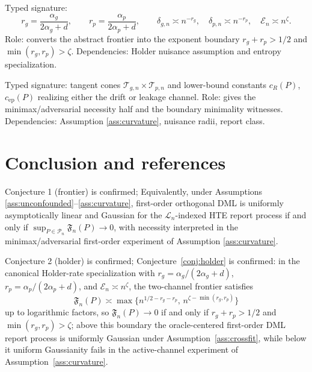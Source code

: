 \documentclass[11pt]{article}
\theoremstyle{definition}
\theoremstyle{plain}
\theoremstyle{remark}
\begin{document}
\begin{description}[leftmargin=2.8cm,style=nextline]
\item[Holder-rate specialization.]
Typed signature:
\[
r_g=\frac{\alpha_g}{2\alpha_g+d},\qquad
r_p=\frac{\alpha_p}{2\alpha_p+d},\qquad
\delta_{g,n}\asymp n^{-r_g},\quad \delta_{p,n}\asymp n^{-r_p},\quad
\mathcal E_n\asymp n^\zeta.
\]
Role: converts the abstract frontier into the exponent boundary
\(r_g+r_p>1/2\) and \(\min(r_g,r_p)>\zeta\).
Dependencies: Holder nuisance assumption and entropy specialization.

\item[Active curvature experiment.]
Typed signature: tangent cones
\(\mathcal T_{g,n}\times\mathcal T_{p,n}\) and lower-bound constants
\(c_R(P)\), \(c_{\mathrm{ep}}(P)\) realizing either the drift or leakage
channel.
Role: gives the minimax/adversarial necessity half and the boundary
minimality witnesses.
Dependencies: Assumption \ref{ass:curvature}, nuisance radii, report class.
\end{description}

\section{Conclusion and references}
Conjecture 1 (frontier) is confirmed; Equivalently, under Assumptions \ref{ass:unconfounded}--\ref{ass:curvature}, first-order orthogonal DML is uniformly asymptotically linear and Gaussian for the \(\mathcal{L}_n\)-indexed HTE report process if and only if \(\sup_{P\in\mathcal{P}_n}\mathfrak{F}_n(P)\to0\), with necessity interpreted in the minimax/adversarial first-order experiment of Assumption \ref{ass:curvature}.

Conjecture 2 (holder) is confirmed; Conjecture~\ref{conj:holder} is confirmed: in the canonical Holder-rate specialization with \(r_g=\alpha_g/(2\alpha_g+d)\), \(r_p=\alpha_p/(2\alpha_p+d)\), and \(\mathcal{E}_n\asymp n^\zeta\), the two-channel frontier satisfies
\[
\mathfrak F_n(P)\asymp
\max\{n^{1/2-r_g-r_p},\,n^{\zeta-\min(r_g,r_p)}\}
\]
up to logarithmic factors, so \(\mathfrak F_n(P)\to0\) if and only if \(r_g+r_p>1/2\) and \(\min(r_g,r_p)>\zeta\); above this boundary the oracle-centered first-order DML report process is uniformly Gaussian under Assumption~\ref{ass:crossfit}, while below it uniform Gaussianity fails in the active-channel experiment of Assumption~\ref{ass:curvature}.
\end{document}
